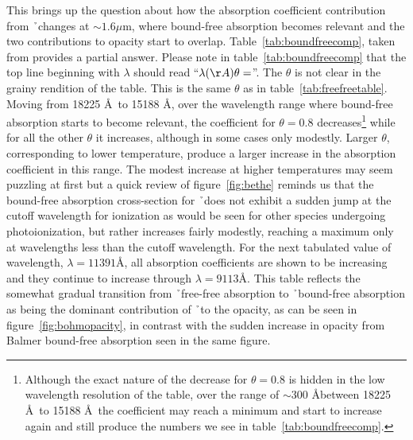 This brings up the question about how the absorption coefficient
contribution from \h\ changes at $\sim 1.6 \mu$m, where bound-free
absorption becomes relevant and the two contributions to opacity start
to overlap.  Table~\ref{tab:boundfreecomp}, taken from \cite{bell1975}
provides a partial answer.  Please note in
table~\ref{tab:boundfreecomp} that the top line beginning with
$\lambda$ should read ``$\lambda(\AA)\theta=$''. The $\theta$ is not
clear in the grainy rendition of the table.  This is the same $\theta$
as in table~\ref{tab:freefreetable}.  Moving from 18225 \AA\ to 15188
\AA, over the wavelength range where bound-free absorption starts to
become relevant, the coefficient for $\theta=$0.8
decreases\footnote{Although the exact nature of the decrease for
  $\theta=$0.8 is hidden in the low wavelength resolution of the
  table, over the range of $\sim$300 \AA between 18225 \AA\ to 15188
  \AA\ the coefficient may reach a minimum and start to increase again
  and still produce the numbers we see in
  table~\ref{tab:boundfreecomp}.} while for all the other $\theta$ it
increases, although in some cases only modestly. Larger $\theta$,
corresponding to lower temperature, produce a larger increase in the
absorption coefficient in this range.  The modest increase at higher
temperatures may seem puzzling at first but a quick review of
figure~\ref{fig:bethe} reminds us that the bound-free absorption
cross-section for \h\ does not exhibit a sudden jump at the cutoff
wavelength for ionization as would be seen for other species
undergoing photoionization, but rather increases fairly modestly,
reaching a maximum only at wavelengths less than the cutoff
wavelength.  For the next tabulated value of wavelength,
$\lambda=11391$\AA, all absorption coefficients are shown to be
increasing and they continue to increase through $\lambda=9113$\AA.  This table reflects the somewhat gradual transition from \h\ free-free absorption to \h\ bound-free absorption as being the dominant contribution of \h\ to the opacity, as can be seen in figure~\ref{fig:bohmopacity}, in contrast with the sudden increase in opacity from Balmer bound-free absorption seen in the same figure.
